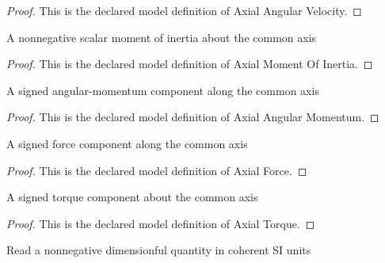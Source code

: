 \begin{proof}
  This is the declared model definition of Axial Angular Velocity.
\end{proof}
\begin{definition}
  \label{def:physics:phyx-mini-0826:phyxminiproblems-problemphyxmini0826-axialmomentofinertia}
  A nonnegative scalar moment of inertia about the common axis
\end{definition}
\begin{proof}
  This is the declared model definition of Axial Moment Of Inertia.
\end{proof}
\begin{definition}
  \label{def:physics:phyx-mini-0826:phyxminiproblems-problemphyxmini0826-axialangularmomentum}
  A signed angular-momentum component along the common axis
\end{definition}
\begin{proof}
  This is the declared model definition of Axial Angular Momentum.
\end{proof}
\begin{definition}
  \label{def:physics:phyx-mini-0826:phyxminiproblems-problemphyxmini0826-axialforce}
  A signed force component along the common axis
\end{definition}
\begin{proof}
  This is the declared model definition of Axial Force.
\end{proof}
\begin{definition}
  \label{def:physics:phyx-mini-0826:phyxminiproblems-problemphyxmini0826-axialtorque}
  A signed torque component about the common axis
\end{definition}
\begin{proof}
  This is the declared model definition of Axial Torque.
\end{proof}
\begin{definition}
  \label{def:physics:phyx-mini-0826:phyxminiproblems-problemphyxmini0826-nonnegativesireadout}
  Read a nonnegative dimensionful quantity in coherent SI units
\end{definition}
